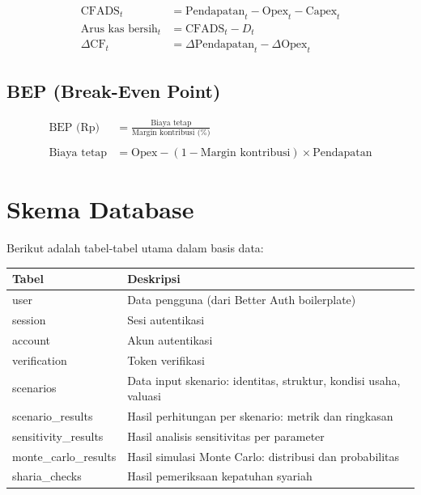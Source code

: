 \documentclass[12pt,a4paper,twoside]{report}
\begin{document}
\begin{align*}
  \text{CFADS}_t &= \text{Pendapatan}_t - \text{Opex}_t - \text{Capex}_t \\
  \text{Arus kas bersih}_t &= \text{CFADS}_t - D_t \\
  \Delta\text{CF}_t &= \Delta\text{Pendapatan}_t - \Delta\text{Opex}_t
\end{align*}

\subsection{BEP (Break-Even Point)}

\begin{align*}
  \text{BEP (Rp)} &= \frac{\text{Biaya tetap}}{\text{Margin kontribusi (\%)}} \\
  \\
  \text{Biaya tetap} &= \text{Opex} - (1 - \text{Margin kontribusi}) \times \text{Pendapatan}
\end{align*}

\section{Skema Database}

Berikut adalah tabel-tabel utama dalam basis data:

\begin{longtable}{@{}p{3cm}>{\raggedright\arraybackslash}p{10cm}@{}}
\toprule
\textbf{Tabel} & \textbf{Deskripsi} \\
\midrule
\endhead
user & Data pengguna (dari Better Auth boilerplate) \\
session & Sesi autentikasi \\
account & Akun autentikasi \\
verification & Token verifikasi \\
scenarios & Data input skenario: identitas, struktur, kondisi usaha, valuasi \\
scenario\_results & Hasil perhitungan per skenario: metrik dan ringkasan \\
sensitivity\_results & Hasil analisis sensitivitas per parameter \\
monte\_carlo\_results & Hasil simulasi Monte Carlo: distribusi dan probabilitas \\
sharia\_checks & Hasil pemeriksaan kepatuhan syariah \\
\bottomrule
\end{longtable}

\appendix
\end{document}
